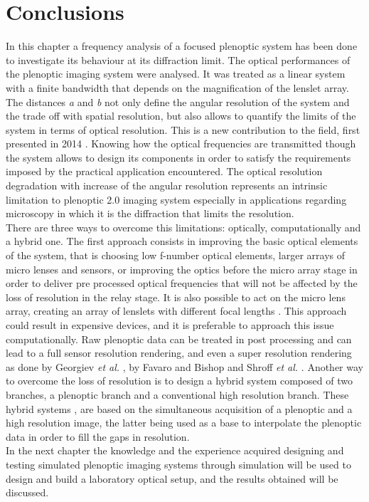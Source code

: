 \section{Conclusions}
 In this chapter a frequency analysis of a focused plenoptic system has been done to investigate its behaviour at its diffraction limit. The optical performances of the plenoptic imaging system were analysed. It was treated as a linear system with a finite bandwidth that depends on the magnification of the lenslet array. The distances \textit{a} and \textit{b} not only define the angular resolution of the system and the trade off with spatial resolution, but also allows to quantify the limits of the system in terms of optical resolution. This is a new contribution to the field, first presented in 2014 \cite{turola2014wave}.  Knowing how the optical frequencies are transmitted though the system allows to design its components in order to satisfy the requirements imposed by the practical application encountered. The optical resolution degradation with increase of the angular resolution represents an intrinsic limitation to plenoptic 2.0 imaging system especially in applications regarding microscopy in which it is the diffraction that limits the resolution.\\
 There are three ways to overcome this limitations: optically, computationally and a hybrid one. The first approach consists in improving the basic optical elements of the system, that is choosing low f-number optical elements, larger arrays of micro lenses and sensors, or improving the optics before the micro array stage in order to deliver pre processed optical frequencies that will not be affected by the loss of resolution in the relay stage. It is also possible to act on the micro lens array, creating an array of lenslets with different focal lengths \cite{georgiev2012multifocus}. This approach could result in expensive devices, and it is preferable to approach this issue computationally.  Raw plenoptic data can be treated in post processing and can lead to a full sensor resolution rendering, and even a super resolution rendering as done by Georgiev \textit{ et al.} \cite{georgiev2009superresolution,georgiev2012super,georgiev2011superresolution,georgiev2015plenoptic,georgiev2009high}, by Favaro and Bishop \cite{favaro2012split,bishop2012light,bishop2011full,bishop2009light} and Shroff \textit{et al.} \cite{shroff2012high,shroff2013image}. Another way to overcome the loss of resolution is to design a hybrid system composed of two branches, a plenoptic branch and a conventional high resolution branch. These hybrid systems \cite{lu2013high,boominathan2014improving}, are based on the simultaneous acquisition of a plenoptic and a high resolution image, the latter being used as a base to interpolate the plenoptic data in order to fill the gaps in resolution.\\
 In the next chapter the knowledge and the experience acquired designing and testing simulated plenoptic imaging systems through simulation will be used to design and build a laboratory optical setup, and the results obtained will be discussed.

   

 